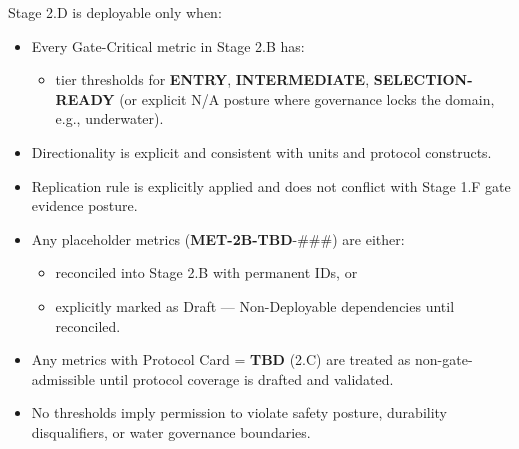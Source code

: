 \documentclass[10pt]{article}
\begin{document}
Stage 2.D is deployable only when:

\begin{itemize}
\item Every Gate-Critical metric in Stage 2.B has:
  \begin{itemize}
  \item tier thresholds for \textbf{ENTRY}, \textbf{INTERMEDIATE}, \textbf{SELECTION-READY} (or explicit N/A posture where governance locks the domain, e.g., underwater).
  \end{itemize}
\item Directionality is explicit and consistent with units and protocol constructs.
\item Replication rule is explicitly applied and does not conflict with Stage 1.F gate evidence posture.
\item Any placeholder metrics (\textbf{MET-2B-TBD}-\#\#\#) are either:
  \begin{itemize}
  \item reconciled into Stage 2.B with permanent IDs, or
  \item explicitly marked as Draft — Non-Deployable dependencies until reconciled.
  \end{itemize}
\item Any metrics with Protocol Card = \textbf{TBD} (2.C) are treated as non-gate-admissible until protocol coverage is drafted and validated.
\item No thresholds imply permission to violate safety posture, durability disqualifiers, or water governance boundaries.
\end{itemize}
\end{document}
